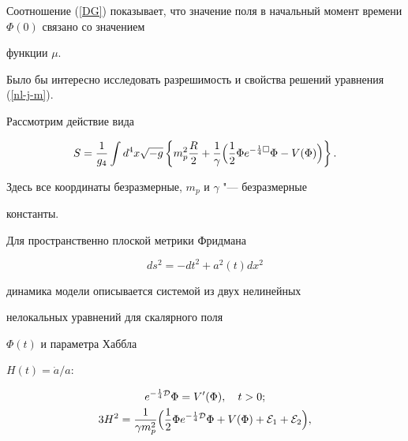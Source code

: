  Соотношение (\ref{DG}) показывает, что значение поля в начальный момент времени $\Phi (0)$ связано со значением

 функции $\mu$.



Было бы интересно исследовать разрешимость и свойства решений уравнения (\ref{nl-j-m}).



\smallskip



\hypertarget{razd:3}{}




Рассмотрим действие вида

\begin{equation*}


S=\frac{1}{g_4}\int

d^4x\sqrt{-g}\left\{m_p^2\frac{R}{2}+\frac{1}{\gamma}\Bigl(\frac1{2}

\Phi e^{-\frac14\Box }\Phi-V(\Phi)\Bigr)\right\}.

\end{equation*}

Здесь все координаты безразмерные,  $m_p$ и $\gamma$ "--- безразмерные

константы.



Для пространственно плоской метрики Фридмана

\begin{equation*}

ds^2=-dt^2+a^2(t)dx^2

\end{equation*}

динамика модели описывается системой из двух нелинейных

нелокальных уравнений \cite{IA04} для скалярного поля

$\Phi (t)$ и параметра Хаббла

 $H(t)=\dot{a}/a$:

\begin{gather*}


e^{-\frac{1}{4}{\cal D}}\Phi =V^\prime(\Phi),\quad t>0;

\\


3H^2=\frac{1}{\gamma m_p^2}\Bigl(\frac{1}{2}\Phi e^{-\frac14\cal D }\Phi

+V(\Phi)+{\cal E}_1+{\cal E}_2\Bigr),

\end{gather*}

